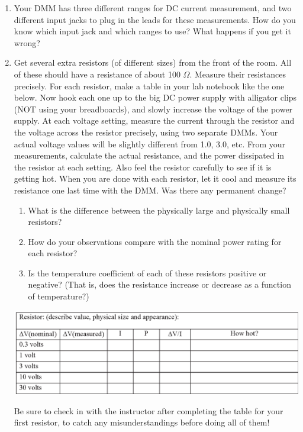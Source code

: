 \begin{enumerate}[wide]

\item Your DMM has three different ranges for DC current measurement, and two different input jacks to plug in the leads for these measurements.  How do you know which input jack and which ranges to use?  What happens if you get it wrong?

\item Get several extra resistors (of different sizes) from the front of the room.  All of these should have a resistance of about 100 $\Omega$.  Measure their resistances precisely.  For each resistor, make a table in your lab notebook like the one below.   Now hook each one up to the big DC power supply with alligator clips (NOT using your breadboards), and slowly increase the voltage of the power supply.  At each voltage setting, measure the current through the resistor and the voltage across the resistor precisely, using two separate DMMs.  Your actual voltage values will be slightly different from 1.0, 3.0, etc.  From your measurements, calculate the actual resistance, and the power dissipated in the resistor at each setting.  Also feel the resistor carefully to see if it is getting hot.  When you are done with each resistor, let it cool and measure its resistance one last time with the DMM.  Was there any permanent change?  
\begin{enumerate}
\item What is the difference between the physically large and physically small resistors?
\item How do your observations compare with the nominal power rating for each resistor?
\item Is the temperature coefficient of each of these resistors positive or negative?  (That is, does the resistance increase or decrease as a function of temperature?)
\end{enumerate}

\begin{center}
\includegraphics[width=1.0\textwidth]{power/iv_table.eps}
\end{center}

Be sure to check in with the instructor after completing the table for your first resistor, to catch any misunderstandings before doing all of them!
\end{enumerate}


